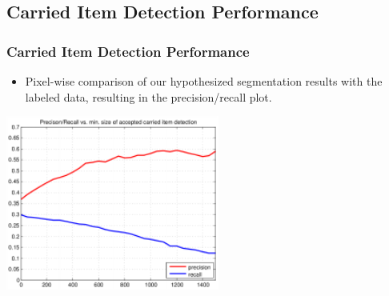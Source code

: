 \documentclass{beamer}
\begin{document}
\subsection{Carried Item Detection Performance}
\begin{frame}
\frametitle{Carried Item Detection Performance} 
\begin{itemize}
	\item Pixel-wise comparison of our hypothesized segmentation results with the labeled data, resulting in the precision/recall plot.
\end{itemize}
\begin{center}
  	\includegraphics[width=7cm]{carried.pdf}
\end{center}

\end{frame}
\end{document}
